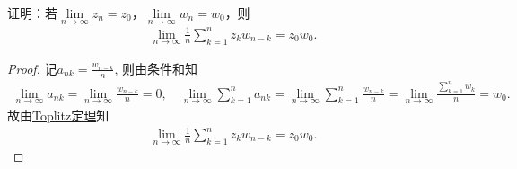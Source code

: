 \documentclass[../../main.tex]{subfiles}%
\begin{document}
\begin{example}
证明：若$\lim\limits_{n \to \infty} z_n = z_0$，$\lim\limits_{n \to \infty} w_n = w_0$，则
\begin{align*}
\lim\limits_{n \to \infty} \frac{1}{n} \sum\limits_{k=1}^n z_k w_{n - k} = z_0 w_0.
\end{align*}
\end{example}
\begin{proof}

记$a_{nk}=\frac{w_{n-k}}{n}$, 则由条件和知
\begin{align*}
\lim\limits_{n\rightarrow \infty}a_{nk}=\lim\limits_{n\rightarrow \infty}\frac{w_{n-k}}{n}=0,\quad \lim\limits_{n\rightarrow \infty}\sum_{k=1}^n{a_{nk}}=\lim\limits_{n\rightarrow \infty}\sum_{k=1}^n{\frac{w_{n-k}}{n}}=\lim\limits_{n\rightarrow \infty}\frac{\sum\limits_{k=1}^n{w_k}}{n}=w_0.
\end{align*}
故由\hyperref[theorem:复变版本-Toplitz定理]{Toplitz定理}知
\begin{align*}
\lim\limits_{n\rightarrow \infty} \frac{1}{n}\sum_{k=1}^n{z_kw_{n-k}}=z_0w_0.
\end{align*}

\end{proof}
\end{document}
